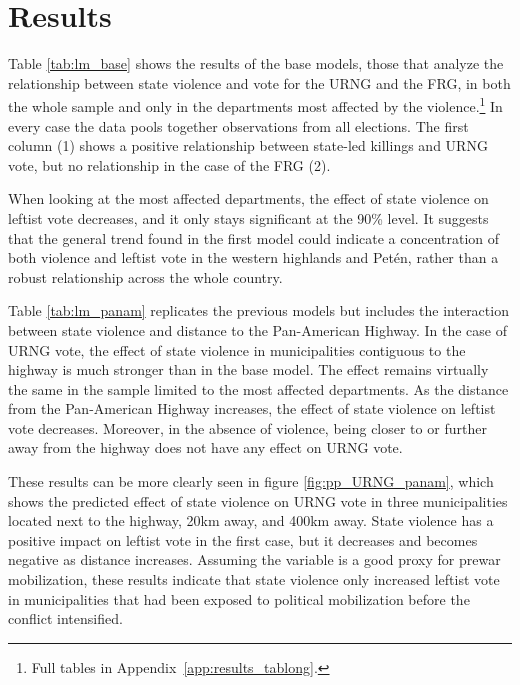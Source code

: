 \documentclass[12pt, notitlepage]{article}
\begin{document}
\section*{Results}

Table \ref{tab:lm_base} shows the results of the base models, those that analyze the relationship between state violence and vote for the URNG and the FRG, in both the whole sample and only in the departments most affected by the violence.\footnote{Full tables in Appendix~\ref{app:results_tablong}.}
In every case the data pools together observations from all elections.
The first column (1) shows a positive relationship between state-led killings and URNG vote, but no relationship in the case of the FRG (2).



When looking at the most affected departments, the effect of state violence on leftist vote decreases, and it only stays significant at the 90\% level.
It suggests that the general trend found in the first model could indicate a concentration of both violence and leftist vote in the western highlands and Petén, rather than a robust relationship across the whole country.

Table \ref{tab:lm_panam} replicates the previous models but includes the interaction between state violence and distance to the Pan-American Highway.
In the case of URNG vote, the effect of state violence in municipalities contiguous to the highway is much stronger than in the base model.
The effect remains virtually the same in the sample limited to the most affected departments.
As the distance from the Pan-American Highway increases, the effect of state violence on leftist vote decreases.
Moreover, in the absence of violence, being closer to or further away from the highway does not have any effect on URNG vote.



These results can be more clearly seen in figure \ref{fig:pp_URNG_panam}, which shows the predicted effect of state violence on URNG vote in three municipalities located next to the highway, 20km away, and 400km away.
State violence has a positive impact on leftist vote in the first case, but it decreases and becomes negative as distance increases.
Assuming the variable is a good proxy for prewar mobilization, these results indicate that state violence only increased leftist vote in municipalities that had been exposed to political mobilization before the conflict intensified.
\end{document}
